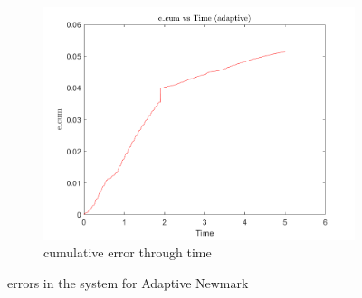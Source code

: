 \documentclass[a4paper,12pt]{article}
\begin{document}
\begin{figure}[h]
  \vspace{0.5cm}

  \begin{subfigure}[b]{0.5\textwidth}
      \includegraphics[width=\textwidth]{../../Matlab/adaptive_plots/e_cum_vs_time.png}
      \caption{cumulative error through time}
      \label{fig:image18}
  \end{subfigure}
  \hfill
  
  \caption{errors in the system for Adaptive Newmark}
  \label{fig:error_adapt_newmark}
\end{figure}
\end{document}
